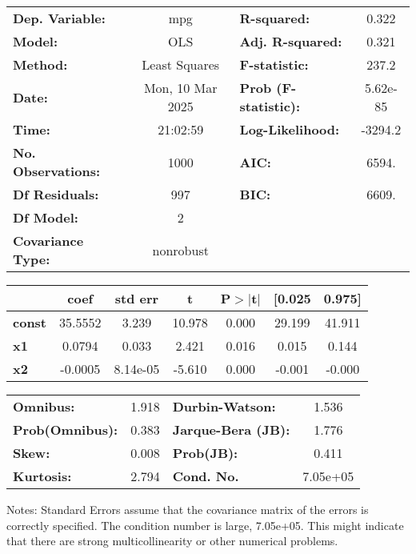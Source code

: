 \begin{center}
\begin{tabular}{lclc}
\toprule
\textbf{Dep. Variable:}    &       mpg        & \textbf{  R-squared:         } &     0.322   \\
\textbf{Model:}            &       OLS        & \textbf{  Adj. R-squared:    } &     0.321   \\
\textbf{Method:}           &  Least Squares   & \textbf{  F-statistic:       } &     237.2   \\
\textbf{Date:}             & Mon, 10 Mar 2025 & \textbf{  Prob (F-statistic):} &  5.62e-85   \\
\textbf{Time:}             &     21:02:59     & \textbf{  Log-Likelihood:    } &   -3294.2   \\
\textbf{No. Observations:} &        1000      & \textbf{  AIC:               } &     6594.   \\
\textbf{Df Residuals:}     &         997      & \textbf{  BIC:               } &     6609.   \\
\textbf{Df Model:}         &           2      & \textbf{                     } &             \\
\textbf{Covariance Type:}  &    nonrobust     & \textbf{                     } &             \\
\bottomrule
\end{tabular}
\begin{tabular}{lcccccc}
               & \textbf{coef} & \textbf{std err} & \textbf{t} & \textbf{P$> |$t$|$} & \textbf{[0.025} & \textbf{0.975]}  \\
\midrule
\textbf{const} &      35.5552  &        3.239     &    10.978  &         0.000        &       29.199    &       41.911     \\
\textbf{x1}    &       0.0794  &        0.033     &     2.421  &         0.016        &        0.015    &        0.144     \\
\textbf{x2}    &      -0.0005  &     8.14e-05     &    -5.610  &         0.000        &       -0.001    &       -0.000     \\
\bottomrule
\end{tabular}
\begin{tabular}{lclc}
\textbf{Omnibus:}       &  1.918 & \textbf{  Durbin-Watson:     } &    1.536  \\
\textbf{Prob(Omnibus):} &  0.383 & \textbf{  Jarque-Bera (JB):  } &    1.776  \\
\textbf{Skew:}          &  0.008 & \textbf{  Prob(JB):          } &    0.411  \\
\textbf{Kurtosis:}      &  2.794 & \textbf{  Cond. No.          } & 7.05e+05  \\
\bottomrule
\end{tabular}
\end{center}

Notes: \newline
 [1] Standard Errors assume that the covariance matrix of the errors is correctly specified. \newline
 [2] The condition number is large, 7.05e+05. This might indicate that there are \newline
 strong multicollinearity or other numerical problems.